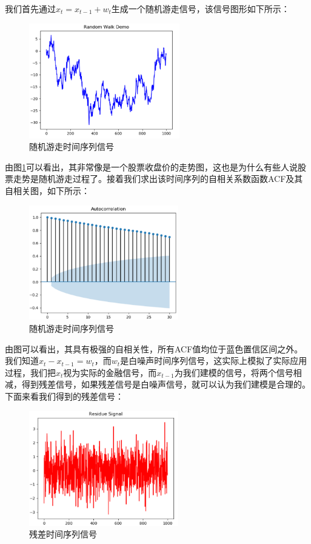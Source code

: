\documentclass{article}
\begin{document}
我们首先通过$x_{t}=x_{t-1}+w_{t}$生成一个随机游走信号，该信号图形如下所示：
\begin{figure}[H]
	\caption{随机游走时间序列信号}
	\label{f000005}
	\centering
	\includegraphics[height=5cm]{images/f000005}
\end{figure}
由图\ref{f000005}可以看出，其非常像是一个股票收盘价的走势图，这也是为什么有些人说股票走势是随机游走过程了。接着我们求出该时间序列的自相关系数函数ACF及其自相关图，如下所示：
\begin{figure}[H]
	\caption{随机游走时间序列信号}
	\label{f000006}
	\centering
	\includegraphics[height=5cm]{images/f000006}
\end{figure}
由图可以看出，其具有极强的自相关性，所有ACF值均位于蓝色置信区间之外。\newline
我们知道$x_{t}-x_{t-1}=w_t$，而$w_t$是白噪声时间序列信号，这实际上模拟了实际应用过程，我们把$x_t$视为实际的金融信号，而$x_{t-1}$为我们建模的信号，将两个信号相减，得到残差信号，如果残差信号是白噪声信号，就可以认为我们建模是合理的。下面来看我们得到的残差信号：
\begin{figure}[H]
	\caption{残差时间序列信号}
	\label{f000007}
	\centering
	\includegraphics[height=5cm]{images/f000007}
\end{figure}
\end{document}
